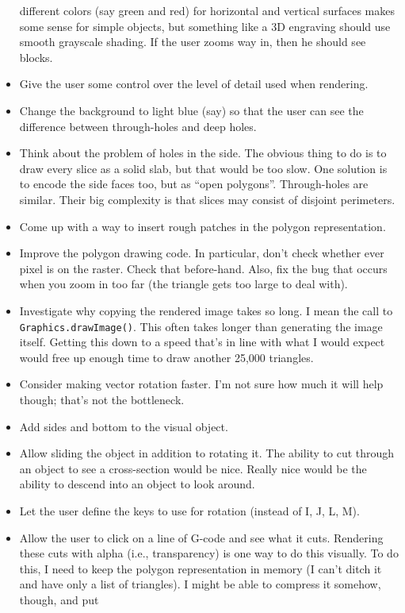 \documentclass[titlepage,oneside,10pt]{article}
\begin{document}
\begin{itemize}
  different colors (say green and red) for horizontal and vertical
  surfaces makes some sense for simple objects, but something like a
  3D engraving should use smooth grayscale shading. If the user zooms
  way in, then he should see blocks.
\item Give the user some control over the level of detail used when
  rendering.
\item Change the background to light blue (say) so that the user can
  see the difference between through-holes and deep holes.
\item Think about the problem of holes in the side. The obvious thing
  to do is to draw every slice as a solid slab, but that would be too
  slow. One solution is to encode the side faces too, but as ``open
  polygons''. Through-holes are similar. Their big complexity is that
  slices may consist of disjoint perimeters.
\item Come up with a way to insert rough patches in the polygon
  representation.
\item Improve the polygon drawing code. In particular, don't check
  whether ever pixel is on the raster. Check that before-hand. Also,
  fix the bug that occurs when you zoom in too far (the triangle gets
  too large to deal with).
\item Investigate why copying the rendered image takes so long. I mean
  the call to {\tt Graphics.drawImage()}. This often takes longer than
  generating the image itself. Getting this down to a speed that's in
  line with what I would expect would free up enough time to draw
  another 25,000 triangles.
\item Consider making vector rotation faster. I'm not sure how much it
  will help though; that's not the bottleneck.
\item Add sides and bottom to the visual object.
\item Allow sliding the object in addition to rotating it. The ability
  to cut through an object to see a cross-section would be
  nice. Really nice would be the ability to descend into an object to
  look around.
\item Let the user define the keys to use for rotation (instead of I,
  J, L, M).
\item Allow the user to click on a line of G-code and see what it
  cuts. Rendering these cuts with alpha (i.e., transparency) is one
  way to do this visually. To do this, I need to keep the polygon
  representation in memory (I can't ditch it and have only a list of
  triangles). I might be able to compress it somehow, though, and put

\end{itemize}
\end{document}
